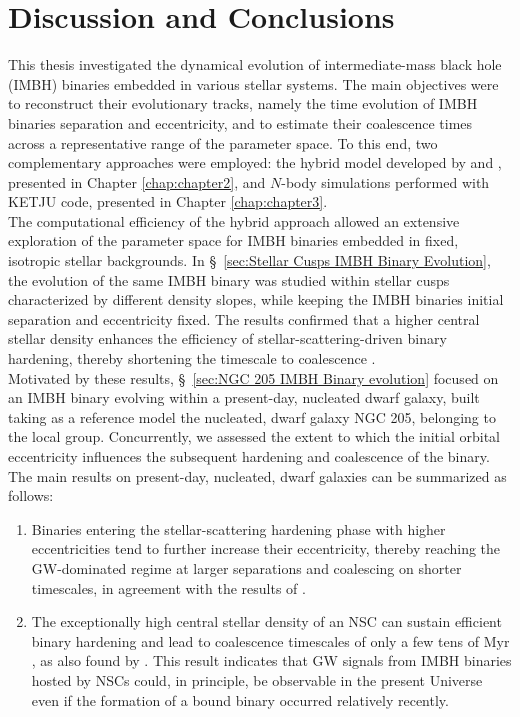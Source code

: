 \documentclass[12pt,twoside,openany]{book}
\begin{document}
\chapter*{Discussion and Conclusions}

This thesis investigated the dynamical evolution of intermediate-mass black hole (IMBH) binaries embedded in various stellar systems. The main objectives were to reconstruct their evolutionary tracks, namely the time evolution of IMBH binaries separation and eccentricity, and to estimate their coalescence times across a representative range of the parameter space. To this end, two complementary approaches were employed: the hybrid model developed by \textcite{Quinlan_1996} and \textcite{Sesana_2010}, presented in Chapter \ref{chap:chapter2}, and $N$-body simulations performed with KETJU code, presented in Chapter \ref{chap:chapter3}.\\The computational efficiency of the hybrid approach allowed an extensive exploration of the parameter space for IMBH binaries embedded in fixed, isotropic stellar backgrounds. In \S~\ref{sec:Stellar Cusps IMBH Binary Evolution}, the evolution of the same IMBH binary was studied within stellar cusps characterized by different density slopes, while keeping the IMBH binaries  initial separation and eccentricity fixed. The results confirmed that a higher central stellar density enhances the efficiency of stellar-scattering-driven binary hardening, thereby shortening the timescale to coalescence \parencite{Sesana_2010}.\\Motivated by these results, \S~\ref{sec:NGC 205 IMBH Binary evolution} focused on an IMBH binary evolving within a present-day, nucleated dwarf galaxy, built taking as a reference model the nucleated, dwarf galaxy NGC 205, belonging to the local group. Concurrently, we assessed the extent to which the initial orbital eccentricity influences the subsequent hardening and coalescence of the binary.\\The main results on present-day, nucleated, dwarf galaxies can be summarized as follows:
\begin{enumerate}
\item Binaries entering the stellar-scattering hardening phase with higher eccentricities tend to further increase their eccentricity, thereby reaching the GW-dominated regime at larger separations and coalescing on shorter timescales, in agreement with the results of \textcite{Sesana_2010}.
\item The exceptionally high central stellar density of an NSC can sustain efficient binary hardening and lead to coalescence timescales of only a few tens of $\mathrm{Myr}$, as also found by \textcite{Khan_2021}. This result indicates that GW signals from IMBH binaries hosted by NSCs could, in principle, be observable in the present Universe even if the formation of a bound binary occurred relatively recently.
\end{enumerate}
\end{document}
